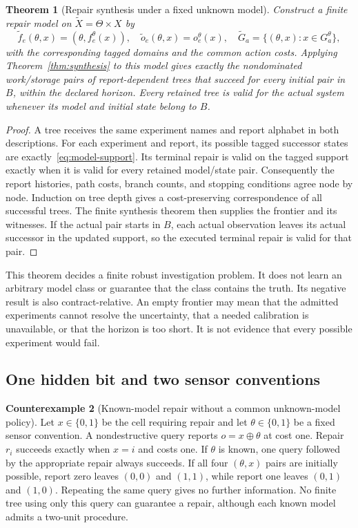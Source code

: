 \documentclass[11pt,letterpaper]{article}
\theoremstyle{plain}
\newtheorem{theorem}{Theorem}[section]
\theoremstyle{definition}
\newtheorem{counterexample}[theorem]{Counterexample}
\begin{document}
\begin{theorem}[Repair synthesis under a fixed unknown model]\label{thm:uncertain-synthesis}
Construct a finite repair model on $\widetilde X=\Theta\times X$ by
\[
\widetilde f_e(\theta,x)=(\theta,f_e^\theta(x)),\quad
\widetilde o_e(\theta,x)=o_e^\theta(x),\quad
\widetilde G_a=\{(\theta,x):x\in G_a^\theta\},
\]
with the corresponding tagged domains and the common action costs. Applying Theorem~\ref{thm:synthesis} to this model gives exactly the nondominated work/storage pairs of report-dependent trees that succeed for every initial pair in $B$, within the declared horizon. Every retained tree is valid for the actual system whenever its model and initial state belong to $B$.
\end{theorem}
\begin{proof}
A tree receives the same experiment names and report alphabet in both descriptions. For each experiment and report, its possible tagged successor states are exactly~\eqref{eq:model-support}. Its terminal repair is valid on the tagged support exactly when it is valid for every retained model/state pair. Consequently the report histories, path costs, branch counts, and stopping conditions agree node by node. Induction on tree depth gives a cost-preserving correspondence of all successful trees. The finite synthesis theorem then supplies the frontier and its witnesses. If the actual pair starts in $B$, each actual observation leaves its actual successor in the updated support, so the executed terminal repair is valid for that pair.
\end{proof}

This theorem decides a finite robust investigation problem. It does not learn an arbitrary model class or guarantee that the class contains the truth. Its negative result is also contract-relative. An empty frontier may mean that the admitted experiments cannot resolve the uncertainty, that a needed calibration is unavailable, or that the horizon is too short. It is not evidence that every possible experiment would fail.

\subsection{One hidden bit and two sensor conventions}
\begin{counterexample}[Known-model repair without a common unknown-model policy]\label{ex:orientation}
Let $x\in\{0,1\}$ be the cell requiring repair and let $\theta\in\{0,1\}$ be a fixed sensor convention. A nondestructive query reports $o=x\oplus\theta$ at cost one. Repair $r_i$ succeeds exactly when $x=i$ and costs one. If $\theta$ is known, one query followed by the appropriate repair always succeeds. If all four $(\theta,x)$ pairs are initially possible, report zero leaves $(0,0)$ and $(1,1)$, while report one leaves $(0,1)$ and $(1,0)$. Repeating the same query gives no further information. No finite tree using only this query can guarantee a repair, although each known model admits a two-unit procedure.
\end{counterexample}
\end{document}
